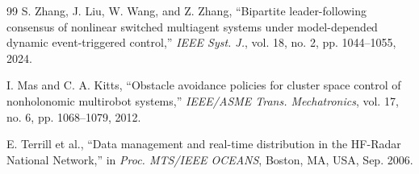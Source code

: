 \documentclass[lettersize,journal]{IEEEtran}
\begin{document}
\begin{thebibliography}{99}
 S. Zhang, J. Liu, W. Wang, and Z. Zhang, ``Bipartite
leader-following consensus of nonlinear switched multiagent systems under
model-depended dynamic event-triggered control,'' \textit{IEEE Syst. J.},
vol. 18, no. 2, pp. 1044--1055, 2024.

 I. Mas and C. A. Kitts, ``Obstacle avoidance policies for cluster
space control of nonholonomic multirobot systems,'' \textit{IEEE/ASME Trans.
Mechatronics}, vol. 17, no. 6, pp. 1068--1079, 2012.

 E. Terrill et al., ``Data management and real-time distribution
in the HF-Radar National Network,'' in \textit{Proc. MTS/IEEE OCEANS},
Boston, MA, USA, Sep. 2006.

\end{thebibliography}
\end{document}
